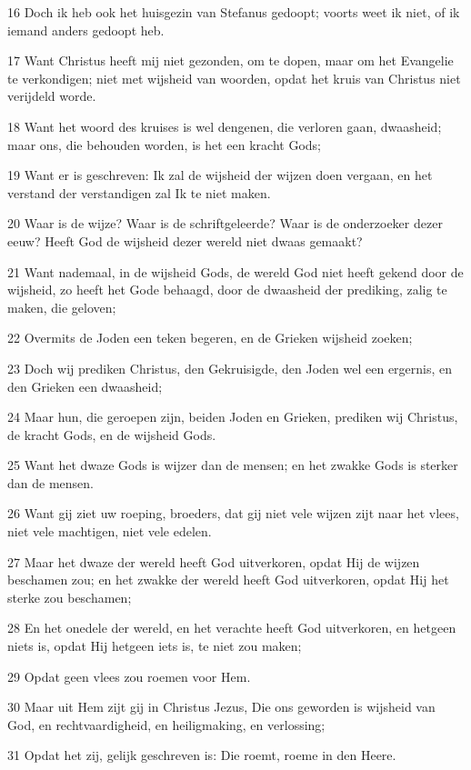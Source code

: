 \par 16 Doch ik heb ook het huisgezin van Stefanus gedoopt; voorts weet ik niet, of ik iemand anders gedoopt heb.
\par 17 Want Christus heeft mij niet gezonden, om te dopen, maar om het Evangelie te verkondigen; niet met wijsheid van woorden, opdat het kruis van Christus niet verijdeld worde.
\par 18 Want het woord des kruises is wel dengenen, die verloren gaan, dwaasheid; maar ons, die behouden worden, is het een kracht Gods;
\par 19 Want er is geschreven: Ik zal de wijsheid der wijzen doen vergaan, en het verstand der verstandigen zal Ik te niet maken.
\par 20 Waar is de wijze? Waar is de schriftgeleerde? Waar is de onderzoeker dezer eeuw? Heeft God de wijsheid dezer wereld niet dwaas gemaakt?
\par 21 Want nademaal, in de wijsheid Gods, de wereld God niet heeft gekend door de wijsheid, zo heeft het Gode behaagd, door de dwaasheid der prediking, zalig te maken, die geloven;
\par 22 Overmits de Joden een teken begeren, en de Grieken wijsheid zoeken;
\par 23 Doch wij prediken Christus, den Gekruisigde, den Joden wel een ergernis, en den Grieken een dwaasheid;
\par 24 Maar hun, die geroepen zijn, beiden Joden en Grieken, prediken wij Christus, de kracht Gods, en de wijsheid Gods.
\par 25 Want het dwaze Gods is wijzer dan de mensen; en het zwakke Gods is sterker dan de mensen.
\par 26 Want gij ziet uw roeping, broeders, dat gij niet vele wijzen zijt naar het vlees, niet vele machtigen, niet vele edelen.
\par 27 Maar het dwaze der wereld heeft God uitverkoren, opdat Hij de wijzen beschamen zou; en het zwakke der wereld heeft God uitverkoren, opdat Hij het sterke zou beschamen;
\par 28 En het onedele der wereld, en het verachte heeft God uitverkoren, en hetgeen niets is, opdat Hij hetgeen iets is, te niet zou maken;
\par 29 Opdat geen vlees zou roemen voor Hem.
\par 30 Maar uit Hem zijt gij in Christus Jezus, Die ons geworden is wijsheid van God, en rechtvaardigheid, en heiligmaking, en verlossing;
\par 31 Opdat het zij, gelijk geschreven is: Die roemt, roeme in den Heere.

